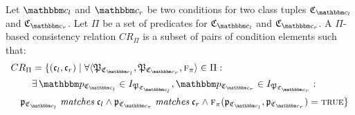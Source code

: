 \begin{definition} \label{def:predicatebasedconsistencyrelation}
Let $\condition{c}{l}$ and $\condition{c}{r}$ be two conditions for two class tuples $\classtuple{C}{\condition{c}{l}}$ and $\classtuple{C}{\condition{c}{r}}$. 
Let $\Pi$ be a set of predicates for $\classtuple{C}{\condition{c}{l}}$ and $\classtuple{C}{\condition{c}{r}}$. A $\Pi$-based consistency relation $CR_{\Pi}$ is a subset of pairs of condition elements such that:
\begin{align*}
&
CR_{\Pi} = \setted{(\conditionelement{c}{l}, \conditionelement{c}{r}) \mid \forall \tupled{\propertysettuple{P}{\classtuple{C}{\condition{c}{l}}}, \propertysettuple{P}{\classtuple{C}{\condition{c}{r}}}, \function{f}_\pi} \in \Pi : \\
& \formulaskip\formulaskip
\exists \propertyvalueset{p}{\classtuple{C}{\condition{c}{l}}} \in \instances{\propertysettuple{P}{\classtuple{C}{\condition{c}{l}}}},
\propertyvalueset{p}{\classtuple{C}{\condition{c}{r}}} \in \instances{\propertysettuple{P}{\classtuple{C}{\condition{c}{r}}}}:\\
& \formulaskip
\propertyvaluesettuple{p}{\classtuple{C}{\condition{c}{l}}} \matchesmath \conditionelement{c}{l} %
\land \propertyvaluesettuple{p}{\classtuple{C}{\condition{c}{r}}} \matchesmath \conditionelement{c}{r} %
\land \function{f}_{\pi}(\propertyvaluesettuple{p}{\classtuple{C}{\condition{c}{l}}}, \propertyvaluesettuple{p}{\classtuple{C}{\condition{c}{r}}}) = \textsc{true}}
\end{align*}
\end{definition}

